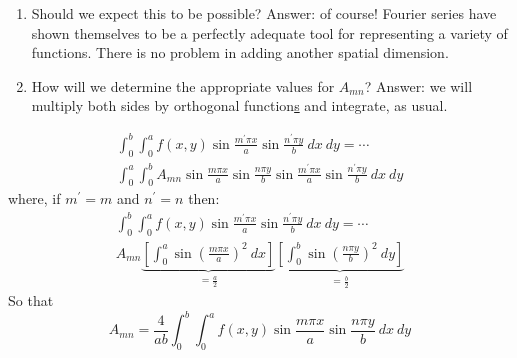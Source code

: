 \begin{enumerate}

\item Should we expect this to be possible?  Answer: of course!  Fourier series have shown themselves to be a perfectly adequate tool for representing a variety of functions.  There is no problem in adding another spatial dimension.

\item How will we determine the appropriate values for $A_{mn}$?  Answer: we will multiply both sides by orthogonal function\underline{s} and integrate, as usual.

\end{enumerate}
\begin{multline*}
\int_0^b \int_0^a f(x,y) \sin{\frac{m^{\prime} \pi x}{a}} \sin{\frac{n^{\prime} \pi y}{b}} \ dx \ dy = \cdots \\ \int_0^a \int_0^b A_{mn}\sin{\frac{m \pi x}{a}} \sin{\frac{n \pi y}{b}}\sin{\frac{m^{\prime} \pi x}{a}} \sin{\frac{n^{\prime} \pi y}{b}} \ dx \ dy
\end{multline*}
where, if $m^{\prime}=m$ and $n^{\prime} = n$ then:
\begin{multline*}
\int_0^b \int_0^a f(x,y) \sin{\frac{m^{\prime} \pi x}{a}} \sin{\frac{n^{\prime} \pi y}{b}} \ dx \ dy = \cdots \\ A_{mn} \underbrace{\left[\int_0^a \sin{(\frac{m \pi x}{a})}^2 \ dx \right]}_{=\frac{a}{2}} \underbrace{ \left[ \int_0^b \sin{(\frac{n \pi y}{b})}^2 \ dy \right]}_{=\frac{b}{2}}
\end{multline*}
So that
\begin{equation}
A_{mn} = \frac{4}{a b} \int_0^b \int_0^a f(x,y) \sin{\frac{m \pi x}{a}} \sin{\frac{n \pi y}{b}} \ dx \ dy
\label{eq:double-fourier-coeff}
\end{equation}

